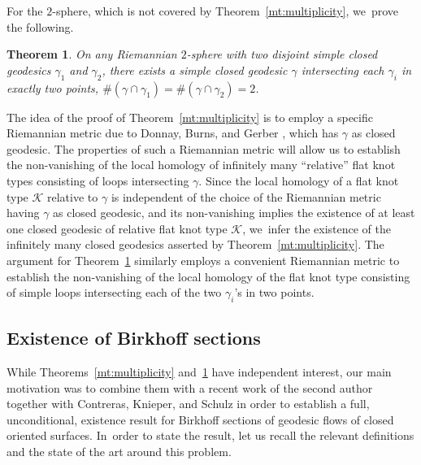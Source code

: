\documentclass[JEP,XML,SOM,Unicode,NoFloatCountersInSection,published]{cedram}
\newcommand{\KK}{\mathcal{K}}
\theoremstyle{plain}
\newtheorem{MainThm}{Theorem}
\theoremstyle{definition}
\begin{document}
For the $2$-sphere, which is not covered by Theorem~\ref{mt:multiplicity}, we~prove the following.

\begin{MainThm}\label{mt:sphere}
On any Riemannian $2$-sphere with two disjoint simple closed geodesics $\gamma_1$ and $\gamma_2$, there exists a simple closed geodesic $\gamma$ intersecting each $\gamma_i$ in exactly two points, \ie
$\# (\gamma\cap\gamma_1) = \#(\gamma\cap\gamma_2)=2$.
\end{MainThm}

The idea of the proof of Theorem~\ref{mt:multiplicity} is to employ a specific Riemannian metric due to Donnay, Burns, and Gerber \cite{Donnay:1988ab, Burns:1989aa}, which has $\gamma$ as closed geodesic. The properties of such a Riemannian metric will allow us to establish the non-vanishing of the local homology of infinitely many ``relative'' flat knot types consisting of loops intersecting $\gamma$. Since the local homology of a flat knot type $\KK$ relative to $\gamma$ is independent of the choice of the Riemannian metric having $\gamma$ as closed geodesic, and its non-vanishing implies the existence of at least one closed geodesic of relative flat knot type $\KK$, we~infer the existence of the infinitely many closed geodesics asserted by Theorem~\ref{mt:multiplicity}. The argument for Theorem~\ref{mt:sphere} similarly employs a convenient Riemannian metric to establish the non-vanishing of the local homology of the flat knot type consisting of simple loops intersecting each of the two $\gamma_i$'s in two points.

\subsection{Existence of Birkhoff sections}

While Theorems~\ref{mt:multiplicity} and~\ref{mt:sphere} have independent interest, our main motivation was to combine them with a recent work of the second author together with Contreras, Knieper, and Schulz \cite{Contreras:2022ab} in order to establish a full, unconditional, existence result for Birkhoff sections of geodesic flows of closed oriented surfaces. In~order to state the result, let us recall the relevant definitions and the state of the art around this problem.
\end{document}
